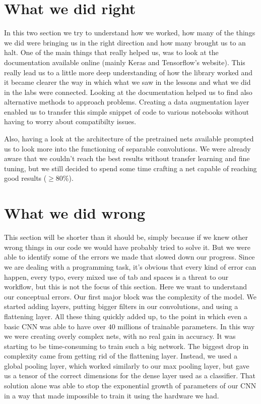 \documentclass[a4paper,12pt]{article}
\numberwithin{equation}{section}
\begin{document}
\section*{What we did right}
In this two section we try to understand how we worked, how many of the things we did were bringing us in the right direction and how many brought us to an halt. One of the main things that really helped us, was to look at the documentation available online (mainly Keras and Tensorflow's website). This really lead us to a little more deep understanding of how the library worked and it became clearer the way in which what we saw in the lessons and what we did in the labs were connected. Looking at the documentation helped us to find also alternative methods to approach problems. Creating a data augmentation layer enabled us to transfer this simple snippet of code to various notebooks without having to worry about compatibilty issues. 

Also, having a look at the architecture of the pretrained nets available prompted us to look more into the functioning of separable convolutions. We were already aware that we couldn't reach the best results without transfer learning and fine tuning, but we still decided to spend some time crafting a net capable of reaching good results (\(\geq 80\%\)).
\section*{What we did wrong}
This section will be shorter than it should be, simply because if we knew other wrong things in our code we would have probably tried to solve it. But we were able to identify some of the errors we made that slowed down our progress. Since we are dealing with a programming task, it's obvious that every kind of error can happen, every typo, every mixed use of tab and spaces is a threat to our workflow, but this is not the focus of this section. Here we want to understand our conceptual errors. Our first major block was the complexity of the model. We started adding layers, putting bigger filters in our convolutions, and using a flattening layer. All these thing quickly added up, to the point in which even a basic CNN was able to have over \(40\) millions of trainable parameters. In this way we were creating overly complex nets, with no real gain in accuracy. It was starting to be time-consuming to train such a big network. The biggest drop in complexity came from getting rid of the flattening layer. Instead, we used a global pooling layer, which worked similarly to our max pooling layer, but gave us a tensor of the correct dimensions for the dense layer used as a classifier. That solution alone was able to stop the exponential growth of parameters of our CNN in a way that made impossible to train it using the hardware we had. 
\end{document}
